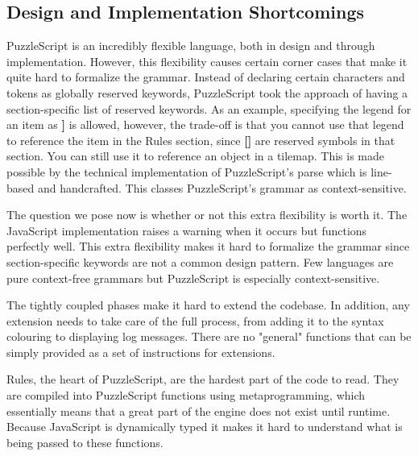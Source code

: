 
\subsection{Design and Implementation Shortcomings}
PuzzleScript is an incredibly flexible language, both in design and through implementation. However, this flexibility causes certain corner cases that make it quite hard to formalize the grammar. Instead of declaring certain characters and tokens as globally reserved keywords, PuzzleScript took the approach of having a section-specific list of reserved keywords. As an example, specifying the legend for an item as \textbf{]} is allowed, however, the trade-off is that you cannot use that legend to reference the item in the Rules section, since \textbf{[]} are reserved symbols in that section. You can still use it to reference an object in a tilemap. This is made possible by the technical implementation of PuzzleScript's parse which is line-based and handcrafted. This classes PuzzleScript's grammar as context-sensitive.

The question we pose now is whether or not this extra flexibility is worth it. The JavaScript implementation raises a warning when it occurs but functions perfectly well. This extra flexibility makes it hard to formalize the grammar since section-specific keywords are not a common design pattern. Few languages are pure context-free grammars but PuzzleScript is especially context-sensitive. 

The tightly coupled phases make it hard to extend the codebase. In addition, any extension needs to take care of the full process, from adding it to the syntax colouring to displaying log messages. There are no "general" functions that can be simply provided as a set of instructions for extensions. 

Rules, the heart of PuzzleScript, are the hardest part of the code to read. They are compiled into PuzzleScript functions using metaprogramming, which essentially means that a great part of the engine does not exist until runtime. Because JavaScript is dynamically typed it makes it hard to understand what is being passed to these functions. 

